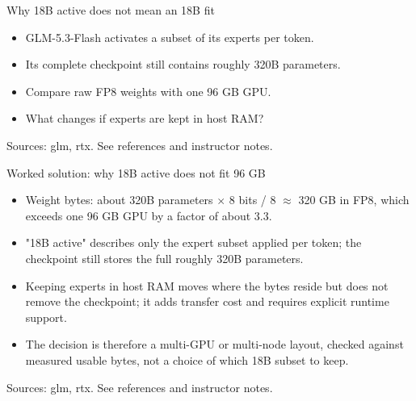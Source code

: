 \documentclass[aspectratio=169,11pt]{beamer}
\begin{document}
\begin{frame}[t,fragile]{Why 18B active does not mean an 18B fit}
\fontsize{11.5}{14}\selectfont
\begin{itemize}\setlength{\itemsep}{2mm}
\item GLM-5.3-Flash activates a subset of its experts per token.
\item Its complete checkpoint still contains roughly 320B parameters.
\item Compare raw FP8 weights with one 96 GB GPU.
\item What changes if experts are kept in host RAM?
\end{itemize}
\vfill{\fontsize{6.5}{8}\selectfont\color{UTgray} Sources: glm, rtx. See references and instructor notes.\par}
\end{frame}
\begin{frame}[t,fragile]{Worked solution: why 18B active does not fit 96 GB}
\fontsize{11.5}{14}\selectfont
\begin{itemize}\setlength{\itemsep}{2mm}
\item Weight bytes: about 320B parameters $\times$ 8 bits / 8 $\approx$ 320 GB in FP8, which exceeds one 96 GB GPU by a factor of about 3.3.
\item "18B active" describes only the expert subset applied per token; the checkpoint still stores the full roughly 320B parameters.
\item Keeping experts in host RAM moves where the bytes reside but does not remove the checkpoint; it adds transfer cost and requires explicit runtime support.
\item The decision is therefore a multi-GPU or multi-node layout, checked against measured usable bytes, not a choice of which 18B subset to keep.
\end{itemize}
\vfill{\fontsize{6.5}{8}\selectfont\color{UTgray} Sources: glm, rtx. See references and instructor notes.\par}
\end{frame}
\end{document}
